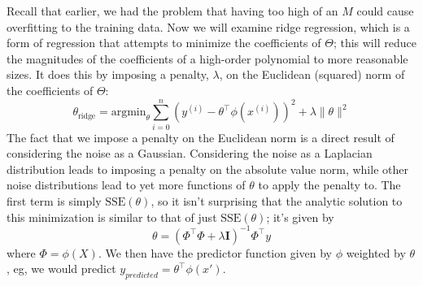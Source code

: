\documentclass[10pt,letterpaper]{article}
\begin{document}
Recall that earlier, we had the problem that having too high of an $M$ could cause overfitting to the training data. Now we will examine ridge regression, which is a form of regression that attempts to minimize the coefficients of $\Theta$; this will reduce the magnitudes of the coefficients of a high-order polynomial to more reasonable sizes. It does this by imposing a penalty, $\lambda$, on the Euclidean (squared) norm of the coefficients of $\Theta$:
$$\theta_{\text{ridge}} = \text{argmin}_\theta\sum_{i=0}^n(y^{(i)} - \theta^\intercal\phi(x^{(i)}))^2 + \lambda\lVert\theta\rVert^2$$
The fact that we impose a penalty on the Euclidean norm is a direct result of considering the noise as a Gaussian. Considering the noise as a Laplacian distribution leads to imposing a penalty on the absolute value norm, while other noise distributions lead to yet more functions of $\theta$ to apply the penalty to. The first term is simply $\text{SSE}(\theta)$, so it isn't surprising that the analytic solution to this minimization is similar to that of just $\text{SSE}(\theta)$; it's given by
\[ \theta = (\Phi^\intercal \Phi + \lambda \mathbf{I})^{-1}\Phi^\intercal y \]
where $\Phi = \phi(X)$. We then have the predictor function given by $\phi$ weighted by $\theta$, eg, we would predict $y_{predicted} = \theta^\intercal \phi(x')$.
\end{document}
